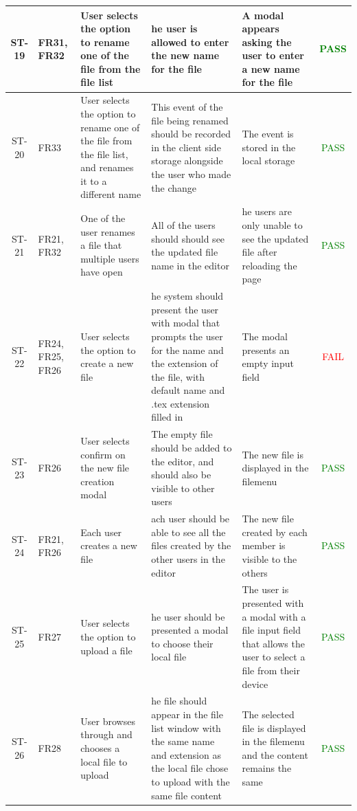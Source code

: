\documentclass[12pt, titlepage]{article}
\begin{document}
\begin{center}
\begin{longtable}{|c|p{1cm}|p{2.7cm}|p{3cm}|p{3cm}|c|}
			\hline
			ST-19 & FR31, FR32 & User selects the option to rename one of the file from the file list & he user is allowed to enter the new name for the file & A modal appears asking the user to enter a new name for the file & \textcolor{green}{PASS} \\
			\hline
			ST-20 & FR33 & User selects the option to rename one of the file from the file list, and renames it to a different name & This event of the file being renamed should be recorded in the client side storage alongside the user who made the change & The event is stored in the local storage & \textcolor{green}{PASS}  \\
			\hline
			ST-21 & FR21, FR32 & One of the user renames a file that multiple users have open & All of the users should should see the updated file name in the editor & he users are only unable to see the updated file after reloading the page & \textcolor{green}{PASS} \\
			\hline
			ST-22 & FR24, FR25, FR26 & User selects the option to create a new file & he system should present the user with modal that prompts the user for the name and the extension of the file, with default name and .tex extension filled in & The modal presents an empty input field &  \textcolor{red}{FAIL} \\
			\hline
			ST-23 & FR26 & User selects confirm on the new file creation modal & The empty file should be added to the editor, and should also be visible to other users & The new file is displayed in the filemenu &  \textcolor{green}{PASS} \\
			\hline
			ST-24 & FR21, FR26 & Each user creates a new file & ach user should be able to see all the files created by the other users in the editor & The new file created by each member is visible to the others & \textcolor{green}{PASS}  \\
			\hline
			ST-25 & FR27 &  User selects the option to upload a file & he user should be presented a modal to choose their local file & The user is presented with a modal with a file input field that allows the user to select a file from their device &  \textcolor{green}{PASS}  \\
			\hline
			ST-26 & FR28 & User browses through and chooses a local file to upload & he file should appear in the file list window with the same name and extension as the local file chose to upload with the same file content & The selected file is displayed in the filemenu and the content remains the same & \textcolor{green}{PASS} \\

\end{longtable}
\end{center}
\end{document}
